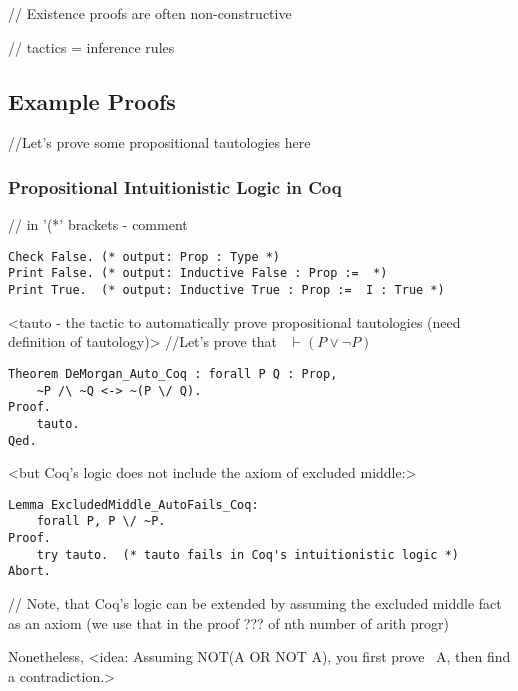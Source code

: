\documentclass[article]{aaltoseries}
\begin{document}
// Existence proofs are often non-constructive


// tactics = inference rules



\subsection{Example Proofs}

//Let's prove some propositional tautologies here

\subsubsection{Propositional Intuitionistic Logic in Coq}

// in '(*' brackets - comment
\begin{lstlisting}[language=coq,caption={Definition of basic propositional terms in Coq}]
Check False. (* output: Prop : Type *)
Print False. (* output: Inductive False : Prop :=  *)
Print True.  (* output: Inductive True : Prop :=  I : True *)
\end{lstlisting}


<tauto - the tactic to automatically prove propositional tautologies (need definition of tautology)>
//Let's prove that ~$\vdash (P \lor \neg P) $
\begin{lstlisting}[language=coq]
Theorem DeMorgan_Auto_Coq : forall P Q : Prop, 
    ~P /\ ~Q <-> ~(P \/ Q).
Proof.
    tauto.
Qed.
\end{lstlisting}


<but Coq's logic does not include the axiom of excluded middle:>
\begin{lstlisting}[language=coq]
Lemma ExcludedMiddle_AutoFails_Coq:
    forall P, P \/ ~P.
Proof.
    try tauto.  (* tauto fails in Coq's intuitionistic logic *)
Abort.
\end{lstlisting}

// Note, that Coq's logic can be extended by assuming the excluded middle fact as an axiom (we use that in the proof ??? of nth number of arith progr)

Nonetheless, <idea: Assuming NOT(A OR NOT A), you first prove ~A, then find a contradiction.>
\end{document}
